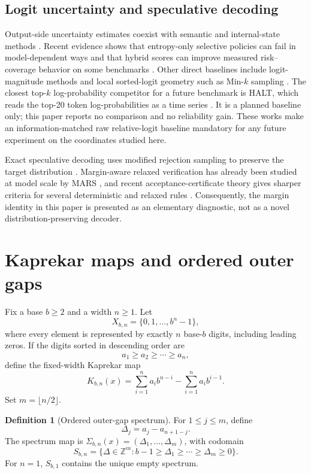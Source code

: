 \documentclass[11pt]{article}
\theoremstyle{definition}
\newtheorem{definition}[theorem]{Definition}
\theoremstyle{remark}
\newcommand{\Z}{\mathbb{Z}}
\newcommand{\1}{\mathbf{1}}
\begin{document}
\subsection{Logit uncertainty and speculative decoding}

Output-side uncertainty estimates coexist with semantic and internal-state
methods \cite{azaria2023,farquhar2024,kossen2024,ma2025}.  Recent evidence
shows that entropy-only selective policies can fail in model-dependent ways
and that hybrid scores can improve measured risk--coverage behavior on some
benchmarks \cite{phillips2026}.  Other direct baselines include logit-magnitude
methods \cite{zhu2026} and local sorted-logit geometry such as Min-$k$
sampling \cite{ding2026}.  The closest top-$k$ log-probability competitor for
a future benchmark is HALT, which reads the top-20 token log-probabilities as
a time series \cite{shapiro2026halt}.  It is a planned baseline only; this
paper reports no comparison and no reliability gain.  These works make an
information-matched raw relative-logit baseline mandatory for any future
experiment on the coordinates studied here.

Exact speculative decoding uses modified rejection sampling to preserve the
target distribution \cite{leviathan2023,chen2023speculative}.  Margin-aware
relaxed verification has already been studied at model scale by MARS
\cite{song2026mars}, and recent acceptance-certificate theory gives sharper
criteria for several deterministic and relaxed rules \cite{sharma2026}.
Consequently, the margin identity in this paper is presented as an elementary
diagnostic, not as a novel distribution-preserving decoder.

\section{Kaprekar maps and ordered outer gaps}

Fix a base $b\geq2$ and a width $n\geq1$.  Let
\[
  X_{b,n}=\{0,1,\ldots,b^n-1\},
\]
where every element is represented by exactly $n$ base-$b$ digits, including
leading zeros.  If the digits sorted in descending order are
\[
  a_1\geq a_2\geq\cdots\geq a_n,
\]
define the fixed-width Kaprekar map
\begin{equation}\label{eq:kaprekar-map}
  K_{b,n}(x)
  =\sum_{i=1}^{n}a_i b^{n-i}-\sum_{i=1}^{n}a_i b^{i-1}.
\end{equation}
Set $m=\lfloor n/2\rfloor$.

\begin{definition}[Ordered outer-gap spectrum]
For $1\leq j\leq m$, define
\[
  \Delta_j=a_j-a_{n+1-j}.
\]
The spectrum map is $\Sigma_{b,n}(x)=(\Delta_1,\ldots,\Delta_m)$, with
codomain
\[
  S_{b,n}=\{\Delta\in\Z^m:
  b-1\geq\Delta_1\geq\cdots\geq\Delta_m\geq0\}.
\]
For $n=1$, $S_{b,1}$ contains the unique empty spectrum.
\end{definition}
\end{document}
